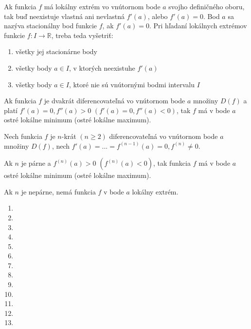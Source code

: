 \begin{veta}
Ak funkcia $f$ má lokálny extrém vo vnútornom bode $a$ svojho definičného oboru,
tak buď neexistuje vlastná ani nevlastná $f'(a)$, alebo $f'(a)=0$. Bod $a$ sa
nazýva stacionálny bod funkcie $f$, ak $f'(a)=0$. Pri hľadaní lokálnych extrémov
funkcie $f:I\rightarrow\mathbb{R}$, treba teda vyšetriť:
\begin{enumerate}
\item všetky jej stacionárne body
\item všetky body $a\in I$, v ktorých neexistuhe $f'(a)$
\item všetky body $a\in I$, ktoré nie sú vnútornými bodmi intervalu $I$
\end{enumerate}
\end{veta}

\begin{veta}
Ak funkcia $f$ je dvakrát diferencovateľná vo vnútornom bode $a$ množiny $D(f)$
a platí $f'(a)=0,f''(a)>0$  $(f'(a)=0,f''(a)<0)$, tak $f$ má v bode $a$ ostré
lokálne minimum (ostré lokálne maximum).
\end{veta}

\begin{veta}
Nech funkcia $f$ je $n$-krát $(n\geq 2)$ diferencovateľná vo vnútornom bode $a$
množiny $D(f)$, nech $f'(a)=...=f^{(n-1)}(a)=0,f^{(n)}\neq 0$.

Ak $n$ je párne a $f^{(n)}(a)>0$  $(f^{(n)}(a)<0)$, tak funkcia $f$ má v bode
$a$ ostré lokálne minimum (ostré lokálne maximum).

Ak $n$ je nepárne, nemá funkcia $f$ v bode $a$ lokálny extrém.
\end{veta}

\begin{enumerate}[resume]
  \item {}
  \item {}
  \item {}
  \item {}
  \item {}
  \item {}
  \item {}
  \item {}
  \item {}
  \item {}
  \item {}
  \item {}
  \item {}
\end{enumerate}
